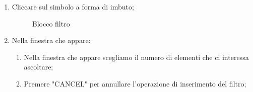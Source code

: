 \begin{enumerate}
	\item Cliccare sul simbolo a forma di imbuto;
	\begin{figure}[!ht]
		\centering
		\caption{Blocco filtro}
	\end{figure}
	\newpage
	\item Nella finestra che appare:
	\begin{enumerate}
		\item Nella finestra che appare scegliamo il numero di elementi che ci interessa ascoltare;
		\item Premere "CANCEL" per annullare l'operazione di inserimento del filtro;

\end{enumerate}
\end{enumerate}

